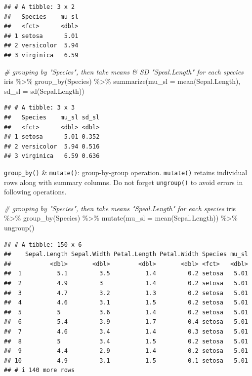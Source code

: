 \documentclass[
]{book}
\newenvironment{Shaded}{\begin{snugshade}}{\end{snugshade}}
\newcommand{\AttributeTok}[1]{\textcolor[rgb]{0.77,0.63,0.00}{#1}}
\newcommand{\CommentTok}[1]{\textcolor[rgb]{0.56,0.35,0.01}{\textit{#1}}}
\newcommand{\FunctionTok}[1]{\textcolor[rgb]{0.00,0.00,0.00}{#1}}
\newcommand{\NormalTok}[1]{#1}
\newcommand{\SpecialCharTok}[1]{\textcolor[rgb]{0.00,0.00,0.00}{#1}}
\begin{document}
\begin{verbatim}
## # A tibble: 3 x 2
##   Species    mu_sl
##   <fct>      <dbl>
## 1 setosa      5.01
## 2 versicolor  5.94
## 3 virginica   6.59
\end{verbatim}

\begin{Shaded}
\begin{Highlighting}[]
\CommentTok{\# grouping by "Species", then take means \& SD "Speal.Length" for each species}
\NormalTok{iris }\SpecialCharTok{\%\textgreater{}\%} 
  \FunctionTok{group\_by}\NormalTok{(Species) }\SpecialCharTok{\%\textgreater{}\%} 
  \FunctionTok{summarize}\NormalTok{(}\AttributeTok{mu\_sl =} \FunctionTok{mean}\NormalTok{(Sepal.Length),}
            \AttributeTok{sd\_sl =} \FunctionTok{sd}\NormalTok{(Sepal.Length))}
\end{Highlighting}
\end{Shaded}

\begin{verbatim}
## # A tibble: 3 x 3
##   Species    mu_sl sd_sl
##   <fct>      <dbl> <dbl>
## 1 setosa      5.01 0.352
## 2 versicolor  5.94 0.516
## 3 virginica   6.59 0.636
\end{verbatim}

\texttt{group\_by()} \& \texttt{mutate()}: group-by-group operation. \texttt{mutate()} retains individual rows along with summary columns. Do not forget \texttt{ungroup()} to avoid errors in following operations.

\begin{Shaded}
\begin{Highlighting}[]
\CommentTok{\# grouping by "Species", then take means "Speal.Length" for each species}
\NormalTok{iris }\SpecialCharTok{\%\textgreater{}\%} 
  \FunctionTok{group\_by}\NormalTok{(Species) }\SpecialCharTok{\%\textgreater{}\%} 
  \FunctionTok{mutate}\NormalTok{(}\AttributeTok{mu\_sl =} \FunctionTok{mean}\NormalTok{(Sepal.Length)) }\SpecialCharTok{\%\textgreater{}\%} 
  \FunctionTok{ungroup}\NormalTok{()}
\end{Highlighting}
\end{Shaded}

\begin{verbatim}
## # A tibble: 150 x 6
##    Sepal.Length Sepal.Width Petal.Length Petal.Width Species mu_sl
##           <dbl>       <dbl>        <dbl>       <dbl> <fct>   <dbl>
##  1          5.1         3.5          1.4         0.2 setosa   5.01
##  2          4.9         3            1.4         0.2 setosa   5.01
##  3          4.7         3.2          1.3         0.2 setosa   5.01
##  4          4.6         3.1          1.5         0.2 setosa   5.01
##  5          5           3.6          1.4         0.2 setosa   5.01
##  6          5.4         3.9          1.7         0.4 setosa   5.01
##  7          4.6         3.4          1.4         0.3 setosa   5.01
##  8          5           3.4          1.5         0.2 setosa   5.01
##  9          4.4         2.9          1.4         0.2 setosa   5.01
## 10          4.9         3.1          1.5         0.1 setosa   5.01
## # i 140 more rows
\end{verbatim}
\end{document}
